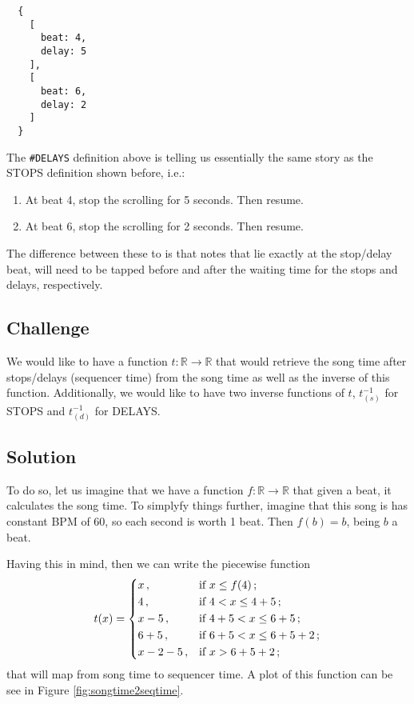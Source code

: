 \documentclass[a4paper,9pt]{article}
\begin{document}
    \begin{verbatim}
  {
    [
      beat: 4,
      delay: 5 
    ],
    [
      beat: 6,
      delay: 2 
    ]
  }
    \end{verbatim}
    The \texttt{\#DELAYS} definition above is telling us essentially the same story as the STOPS definition shown before, i.e.: 
    \begin{enumerate}
	    \item At beat 4, stop the scrolling for 5 seconds. Then resume.
	    \item At beat 6, stop the scrolling for 2 seconds. Then resume.
    \end{enumerate}

    The difference between these to is that notes that lie exactly at the stop/delay beat, will need to be tapped before and after the waiting time for the stops and delays, respectively.
    \subsection{Challenge}

    We would like to have a function $ t: \mathbb{R} \rightarrow \mathbb{R} $ that would retrieve the song time after stops/delays (sequencer time) from the song time as well as the inverse of this function. Additionally, we would like to have two inverse functions of $ t $, $ t^{-1}_{(s)} $ for STOPS and $ t^{-1}_{(d)} $ for DELAYS.


    \subsection{Solution}

    To do so, let us imagine that we have a function $ f : \mathbb{R}\rightarrow \mathbb{R}$ that given a beat, it calculates the song time. To simplyfy things further, imagine that this song is has constant BPM of 60, so each second is worth 1 beat. Then $ f(b) = b $, being $ b $ a beat.

    Having this in mind, then we can write the piecewise function
    \begin{equation}
	    t(x) = \begin{dcases}
		    x\,, & \text{if $ x \leq f(4) $}\,; \\
		    4\,, & \text{if $4 <  x \leq 4+5 $}\,; \\
		    x-5\,, & \text{if $4 + 5 <  x \leq 6 + 5 $}\,; \\
		    6+5\,, & \text{if $6 + 5 <  x \leq 6 + 5+ 2 $}\,; \\
		    x-2-5\,, & \text{if $ x > 6+5+2 $}\,; \\
	    \end{dcases}
	    \label{l}
    \end{equation}
    that will map from song time to sequencer time. A plot of this function can be see in Figure \ref{fig:songtime2seqtime}. 
    
\end{document}
